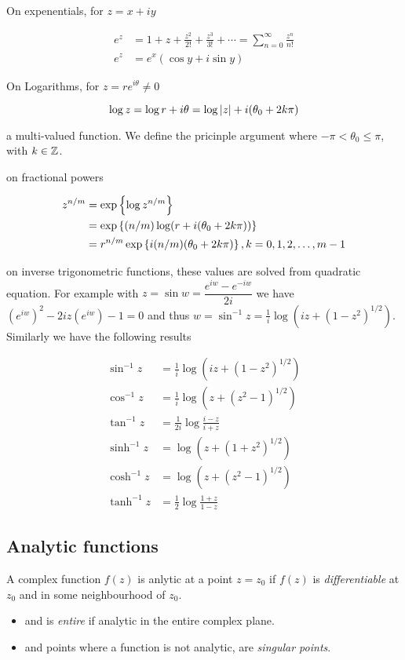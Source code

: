 \documentclass{article}
\begin{document}
On expenentials, for \(z=x+iy\)

\begin{align*}
    e^z &= 1+z+\frac{z^2}{2!}+\frac{z^3}{3!}+\cdots = \sum_{n=0}^\infty \frac{z^n}{n!}\\
    e^z &= e^x(\cos y+i\sin y)
\end{align*}

On Logarithms,  for \(z=re^{i\theta}\neq 0\)

\[\log z = \log r+i\theta = \log\left\vert z\right\vert+i(\theta_0+2k\pi)\]

a multi-valued function. We define the pricinple argument where \(-\pi<\theta_0\leq\pi\), with \(k\in \mathbb{Z}\).

on fractional powers

\begin{align*}
    z^{n/m} &= \exp\left\{ \log z^{n/m} \right\}\\
    &= \exp\left\{ (n/m)\log (r+i(\theta_0+2k\pi)) \right\}\\
    &= r^{n/m}\exp\left\{ i(n/m)(\theta_0+2k\pi) \right\}, k=0,1,2,\dots,m-1
\end{align*}

on inverse trigonometric functions, these values are solved from quadratic equation. For example with \(z=\sin w = \dfrac{e^{iw}-e^{-iw}}{2i}\) we have \((e^{iw})^2-2iz(e^{iw})-1=0\) and thus \(w = \sin^{-1} z = \frac{1}{i}\log(iz+(1-z^2)^{1/2})\). Similarly we have the following results

\begin{align*}
    \sin^{-1} z &= \frac{1}{i}\log(iz+(1-z^2)^{1/2})\\
    \cos^{-1} z &= \frac{1}{i}\log(z+(z^2-1)^{1/2})\\
    \tan^{-1} z &= \frac{1}{2i} \log\frac{i-z}{i+z}\\
    \sinh^{-1}z &= \log(z+(1+z^2)^{1/2})\\
    \cosh^{-1}z &= \log(z+(z^2-1)^{1/2})\\
    \tanh^{-1}z &= \frac{1}{2}\log\frac{1+z}{1-z}
\end{align*}

\subsection{Analytic functions}

\begin{definition}[Analyticity]
    A complex function \(f(z)\) is anlytic at a point \(z=z_0\) if \(f(z)\) is {\em differentiable}  at \(z_0\) and in some neighbourhood of \(z_0\).
    \begin{itemize}
        \item and is {\em entire} if analytic in the entire complex plane.
        \item and points where a function is not analytic, are {\em singular points}.
    \end{itemize}
\end{definition}
\end{document}

